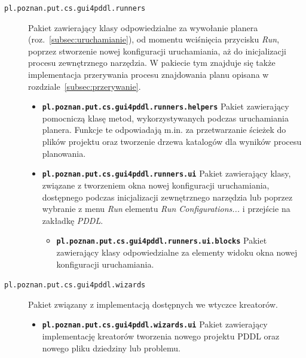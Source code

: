 \begin{description}
\begin{itemize}
\end{itemize}
\item [\texttt{pl.poznan.put.cs.gui4pddl.runners}] Pakiet zawierający klasy odpowiedzialne za wywołanie planera (roz.~\ref{subsec:uruchamianie}), od momentu wciśnięcia przycisku \textit{Run}, poprzez stworzenie nowej konfiguracji uruchamiania, aż do inicjalizacji procesu zewnętrznego narzędzia. W pakiecie tym znajduje się także implementacja przerywania procesu znajdowania planu opisana w rozdziale~\ref{subsec:przerywanie}.
\begin{itemize}
\item \texttt{\textbf{pl.poznan.put.cs.gui4pddl.runners.helpers}} Pakiet zawierający pomocniczą klasę metod, wykorzystywanych podczas uruchamiania planera. Funkcje te odpowiadają m.in. za przetwarzanie ścieżek do plików projektu oraz tworzenie drzewa katalogów dla wyników procesu planowania. 
\item \texttt{\textbf{pl.poznan.put.cs.gui4pddl.runners.ui}} Pakiet zawierający klasy, związane z tworzeniem okna nowej konfiguracji uruchamiania, dostępnego podczas inicjalizacji zewnętrznego narzędzia lub poprzez wybranie z menu \textit{Run} elementu \textit{Run Configurations...} i przejście na zakładkę \textit{PDDL}.
\begin{itemize}
\item \texttt{\textbf{pl.poznan.put.cs.gui4pddl.runners.ui.blocks}} Pakiet zawierający klasy odpowiedzialne za elementy widoku okna nowej konfiguracji uruchamiania.
\end{itemize}
\end{itemize}
\item [\texttt{pl.poznan.put.cs.gui4pddl.wizards}] Pakiet związany z implementacją dostępnych we wtyczce kreatorów.
\begin{itemize}
\item \texttt{\textbf{pl.poznan.put.cs.gui4pddl.wizards.ui}} Pakiet zawierający implementację kreatorów tworzenia nowego projektu PDDL oraz nowego pliku dziedziny lub problemu.
\end{itemize}
\end{description}